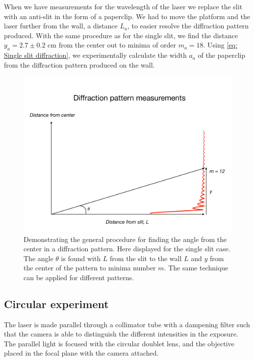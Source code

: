 \documentclass{emulateapj}
\begin{document}
When we have measurements for the wavelength of the laser we replace the slit with an anti-slit in the form of a paperclip. We had to move the platform and the laser further from the wall, a distance $L_a$, to easier resolve the diffraction pattern produced. With the same procedure as for the single slit, we find the distance $y_a = 2.7 \pm 0.2$ cm from the center out to minima of order $m_a = 18$. Using \cref{eq: Single slit diffraction}, we experimentally calculate the width $a_a$ of the paperclip from the diffraction pattern produced on the wall.
\begin{figure}
	\centering
	\includegraphics[width=\linewidth]{diff_measurements.pdf}
	\caption[Geometric measurements in diffraction pattern]{Demonstrating the general procedure for finding the angle from the center in a diffraction pattern. Here displayed for the single slit case. The angle $\theta$ is found with $L$ from the slit to the wall $L$ and $y$ from the center of the pattern to minima number $m$. The same technique can be applied for different patterns.}
	\label{fig: Geometric single slit}
\end{figure}

\subsection{Circular experiment}
\label{subsec: Method/Circular experiment}
The laser is made parallel through a collimator tube with a dampening filter such that the camera is able to distinguish the different intensities in the exposure. The parallel light is focused with the circular doublet lens, and the objective placed in the focal plane with the camera attached. 
\end{document}
